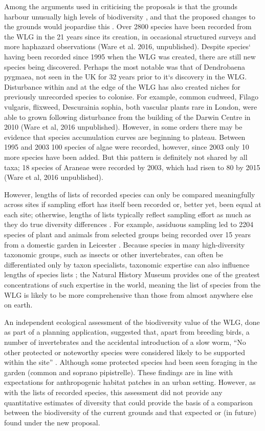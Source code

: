 Among the arguments used in criticising the proposals is that the grounds harbour unusually high levels of biodiversity \citep{changepetition:2015wg}, and that the proposed changes to the grounds would jeopardise this \citep{avery:2015wg}. Over 2800 species have been recorded from the WLG in the 21 years since its creation, in occasional structured surveys and more haphazard observations (Ware et al. 2016, unpublished). Despite species` having been recorded since 1995 when the WLG was created, there are still new species being discovered. Perhaps the most notable was that of Dendrobaena pygmaea, not seen in the UK for 32 years prior to it`s discovery in the WLG.  Disturbance within and at the edge of the WLG has also created niches for previously unrecorded species to colonise. For example, common cudweed, Filago vulgaris, flixweed, Descurainia sophia, both vascular plants rare in London, were able to grown following disturbance from the building of the Darwin Centre in 2010 (Ware et al, 2016 unpublished).  However, in some orders there may be evidence that species accumulation curves are beginning to plateau. Between 1995 and 2003 100 species of algae were recorded, however, since 2003 only 10 more species have been added. But this pattern is definitely not shared by all taxa; 18 species of Araneae were recorded by 2003, which had risen to 80 by 2015 (Ware et al, 2016 unpublished). 

However, lengths of lists of recorded species can only be compared meaningfully across sites if sampling effort has itself been recorded or, better yet, been equal at each site; otherwise, lengths of lists typically reflect sampling effort as much as they do true diversity differences \citep{Gotelli:2001el,Crawley:2005flora}. For example, assiduous sampling led to 2204 species of plant and animals from selected groups being recorded over 15 years from a domestic garden in Leicester \citep{Owen:1991ecology}. Because species in many high-diversity taxonomic groups, such as insects or other invertebrates, can often be differentiated only by taxon specialists, taxonomic expertise can also influence lengths of species lists \citep{Crawley:2005flora}; the Natural History Museum provides one of the greatest concentrations of such expertise in the world, meaning the list of species from the WLG is likely to be more comprehensive than those from almost anywhere else on earth.

An independent ecological assessment of the biodiversity value of the WLG, done as part of a planning application, suggested that, apart from breeding birds, a number of invertebrates and the accidental introduction of a slow worm, ``No other protected or noteworthy species were considered likely to be supported within the site'' \citep{PrelimEcoAppraisal:2015cf,ImpactAssessment:2015cf}. Although some protected species had been seen foraging in the garden (common and soprano pipistrelle). These findings are in line with expectations for anthropogenic habitat patches in an urban setting. However, as with the lists of recorded species, this assessment did not provide any quantitative estimates of diversity that could provide the basis of a comparison between the biodiversity of the current grounds and that expected or (in future) found under the new proposal.

